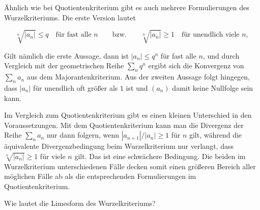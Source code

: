 \begin{antwort}
  Ähnlich wie bei Quotientenkriterium gibt es 
  auch mehrere Formulierungen des 
  Wurzelkriteriums. Die erste Version lautet

  \medskip
  \noindent
  \[ 
  \sqrt[n]{|a_n|}\le q \quad \text{für fast alle $n$} \qquad\text{bzw.}\qquad
  \sqrt[n]{|a_n|} \ge 1 \quad\text{für unendlich viele $n$},
  \]

  \medskip
  Gilt nämlich die erste Aussage, dann ist $|a_n| \le q^n$ für fast alle
  $n$, und durch Vergleich mit der geometrischen Reihe $\sum_n q^n$ ergibt 
  sich die Konvergenz von $\sum_n a_n$ aus dem Majorantenkriterium. 
  Aus der zweiten Aussage folgt hingegen, 
  dass $|a_n|$ für unendlich oft größer als $1$ ist 
  und $(a_n)$ damit keine Nullfolge sein kann.

  Im Vergleich zum Quotientenkriterium gibt es einen kleinen Unterschied in 
  den Voraussetzungen. Mit dem Quotientenkriterium kann man die Divergenz 
  der Reihe $\sum_n a_n$ nur dann folgern, wenn $|a_{n+1}|/|a_n|\ge1$ 
  für  $n$ gilt, während die äquivalente 
  Divergenzbedingung beim Wurzelkriterium nur verlangt, dass 
  $\sqrt[n]{|a_n|}\ge 1$ für  
  viele $n$ gilt. Das ist eine schwächere 
  Bedingung. Die beiden im Wurzelkriterium unterschiedenen Fälle decken 
  somit einen größeren Bereich aller möglichen Fälle ab als die entsprechenden 
  Formulierungen im Quotientenkriterium.  \AntEnd
\end{antwort}

\begin{frage}
  Wie lautet die Limesform des Wurzelkriteriums?
\end{frage}

